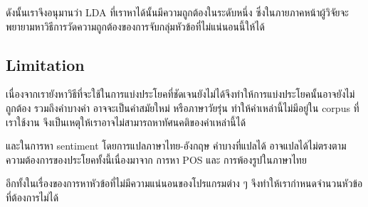 ดังนั้นเราจึงอนุมานว่า LDA ที่เราหาได้นั้นมีความถูกต้องในระดับหนึ่ง ซึ่งในภายภาคหน้าผู้วิจัยจะพยายามหาวิธีการวัดความถูกต้องของการจับกลุ่มหัวข้อที่ไม่แน่นอนนี้ให้ได้




\subsection*{Limitation}
เนื่องจากเรายังหาวิธีที่จะใช้ในการแบ่งประโยคที่ชัดเจนยังไม่ได้จึงทำให้การแบ่งประโยคนั้นอาจยังไม่ถูกต้อง รวมถึงคำบางคำ อาจจะเป็นคำสมัยใหม่ หรือภาษาวัยรุ่น ทำให้คำเหล่านี้ไม่มีอยู่ใน corpus ที่เราใช้งาน จึงเป็นเหตุให้เราอาจไม่สามารถหาทัศนคติของคำเหล่านี้ได้

และในการหา sentiment โดยการแปลภาษาไทย-อังกฤษ คำบางที่แปลได้ อาจแปลได้ไม่ตรงตามความต้องการของประโยคทั้งนี้เนื่องมาจาก การหา POS และ การพ้องรูปในภาษาไทย

อีกทั้งในเรื่องของการหาหัวข้อที่ไม่มีความแน่นอนของโปรแกรมต่าง ๆ จึงทำให้เรากำหนดจำนวนหัวข้อที่ต้องการไม่ได้



%
%



